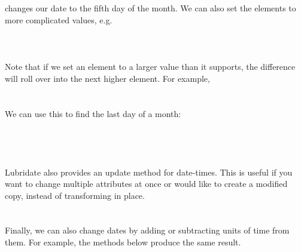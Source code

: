\documentclass[article]{jss}
\begin{document}
\\
\\

changes our date to the fifth day of the month. We can also set the elements to more complicated values, e.g.\\

\\
\\
\\

Note that if we set an element to a larger value than it supports, the difference will roll over into the next higher element. For example,\\

\\
\\

We can use this to find the last day of a month:\\

\\
\\
\\
\\


Lubridate also provides an update method for date-times.  This is useful if you want to change multiple attributes at once or would like to create a modified copy, instead of transforming in place.\\

\\
\\

Finally, we can also change dates by adding or subtracting units of time from them. For example, the methods below produce the same result.\\

\\

\\
\\
\end{document}
